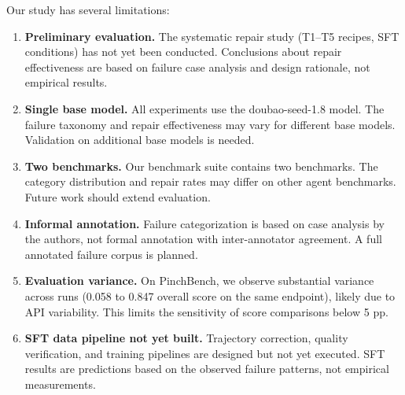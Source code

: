 Our study has several limitations:

\begin{enumerate}[leftmargin=2em, itemsep=1pt]

  \item \textbf{Preliminary evaluation.} The systematic repair study (T1--T5 recipes, SFT conditions) has not yet been conducted. Conclusions about repair effectiveness are based on failure case analysis and design rationale, not empirical results.

  \item \textbf{Single base model.} All experiments use the doubao-seed-1.8 model. The failure taxonomy and repair effectiveness may vary for different base models. Validation on additional base models is needed.

  \item \textbf{Two benchmarks.} Our benchmark suite contains two benchmarks. The category distribution and repair rates may differ on other agent benchmarks. Future work should extend evaluation.

  \item \textbf{Informal annotation.} Failure categorization is based on case analysis by the authors, not formal annotation with inter-annotator agreement. A full annotated failure corpus is planned.

  \item \textbf{Evaluation variance.} On PinchBench, we observe substantial variance across runs (0.058 to 0.847 overall score on the same endpoint), likely due to API variability. This limits the sensitivity of score comparisons below 5 pp.

  \item \textbf{SFT data pipeline not yet built.} Trajectory correction, quality verification, and training pipelines are designed but not yet executed. SFT results are predictions based on the observed failure patterns, not empirical measurements.

\end{enumerate}
